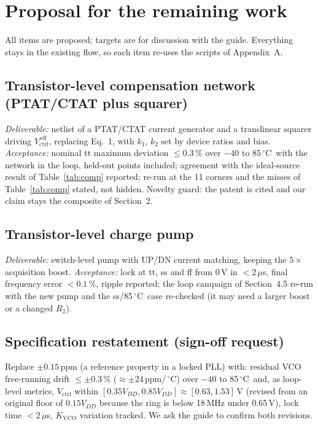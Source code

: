 \documentclass[11pt,a4paper]{article}
\newcommand{\kvco}{K_{\mathrm{VCO}}}
\newcommand{\vc}{V_{\mathrm{ctrl}}}
\newcommand{\degC}{\,$^\circ$C}
\begin{document}
\section{Proposal for the remaining work}
All items are proposed; targets are for discussion with the guide. Everything stays in the existing flow, so each item re-uses the scripts of Appendix~A.

\subsection{Transistor-level compensation network (PTAT/CTAT plus squarer)}
\emph{Deliverable:} netlist of a PTAT/CTAT current generator and a translinear squarer driving $\vc^{\,\mathrm{eff}}$, replacing Eq.~1, with $k_1$, $k_2$ set by device ratios and bias. \emph{Acceptance:} nominal tt maximum deviation $\le0.3\,\%$ over $-40$ to 85\degC\ with the network in the loop, held-out points included; agreement with the ideal-source result of Table~\ref{tab:comp} reported; re-run at the 11 corners and the misses of Table~\ref{tab:comp} stated, not hidden. Novelty guard: the patent \cite{ortner17} is cited and our claim stays the composite of Section~2.

\subsection{Transistor-level charge pump}
\emph{Deliverable:} switch-level pump with UP/DN current matching, keeping the $5\times$ acquisition boost. \emph{Acceptance:} lock at tt, ss and ff from 0\,V in $<2\,\mu$s, final frequency error $<0.1\,\%$, ripple reported; the loop campaign of Section~4.5 re-run with the new pump and the ss/85\degC\ case re-checked (it may need a larger boost or a changed $R_2$).

\subsection{Specification restatement (sign-off request)}
Replace $\pm0.15$\,ppm (a reference property in a locked PLL) with: residual VCO free-running drift $\le\pm0.3\,\%$ ($\approx\pm24$\,ppm/\degC) over $-40$ to 85\degC\ and, as loop-level metrics, $\vc$ within $[0.35V_{DD},0.85V_{DD}]\approx[0.63,1.53]$\,V (revised from an original floor of $0.15V_{DD}$ because the ring is below 18\,MHz under 0.65\,V), lock time $<2\,\mu$s, $\kvco$ variation tracked. We ask the guide to confirm both revisions.
\end{document}
